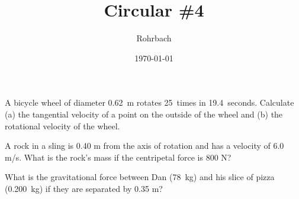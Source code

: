 \documentclass[10pt]{exam}
\title{Circular \#4}
\author{Rohrbach}
\date{\today}
\begin{document}
\maketitle

\begin{questions}


\question 
  A bicycle wheel of diameter 0.62~m rotates 25~times in 19.4~seconds.  Calculate (a) the tangential velocity of a point on the outside of the wheel and (b) the rotational velocity of the wheel.
  \vs

\question
  A rock in a sling is 0.40 m from the axis of rotation and has a velocity of 6.0 m/s.  What is the rock's mass if the centripetal force is 800 N?
  \vs

\question 
  What is the gravitational force between Dan (78~kg) and his slice of pizza (0.200~kg) if they are separated by 0.35 m?
  \vs


\end{questions}
\end{document}
